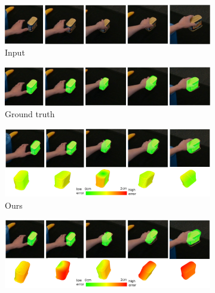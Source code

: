 \begin{figure}[!ht]
    \begin{subfigure}{0.98\textwidth}
        \includegraphics[width=\linewidth]{figs/1_rgb}
        \caption{Input}
    \end{subfigure}
    \hfill
    \begin{subfigure}{0.98\textwidth}
        \includegraphics[width=\linewidth]{figs/1_0}
        \caption{Ground truth}
    \end{subfigure}
    \hfill
    \begin{subfigure}{0.98\textwidth}
        \includegraphics[width=\linewidth]{figs/1_1}
        \caption{Ours}
    \end{subfigure}
    \hfill
    \begin{subfigure}{0.98\textwidth}
        \includegraphics[width=\linewidth]{figs/1_2}
        \caption{\cite{wang2023deep}}
    \end{subfigure}
    \hfill
    \begin{subfigure}{0.98\textwidth}

\end{subfigure}
\end{figure}
